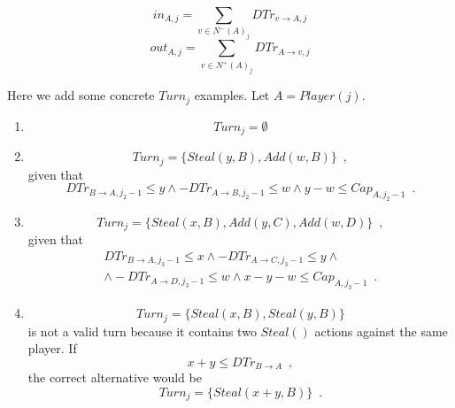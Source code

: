 \documentclass[11pt]{llncs}
\theoremstyle{definition}
\begin{document}
     \begin{definition}
     \label{inouttrust}
        \begin{equation}
           in_{A, j} = \sum\limits_{v \in N^{-}\left(A\right)_j}DTr_{v \rightarrow A, j}
        \end{equation}
        \begin{equation}
           out_{A, j} = \sum\limits_{v \in N^{+}\left(A\right)_j}DTr_{A \rightarrow v, j}
        \end{equation}
     \end{definition}
     
     Here we add some concrete $Turn_j$ examples. Let $A = Player(j)$.
     \begin{enumerate}
        \item \begin{equation*}
           Turn_j = \emptyset
        \end{equation*}
        \item \begin{equation*}
           Turn_j = \{Steal\left(y, B\right), Add\left(w, B\right)\} \enspace,
        \end{equation*}
        given that
        \begin{equation*}
           DTr_{B \rightarrow A, j_2 - 1} \leq y \wedge -DTr_{A \rightarrow B, j_2 - 1} \leq w \wedge y - w \leq
           Cap_{A, j_2-1} \enspace.
        \end{equation*}
        \item \begin{equation*}
           Turn_j = \{Steal\left(x, B\right), Add\left(y, C\right), Add\left(w, D\right)\} \enspace,
        \end{equation*}
        given that
        \begin{equation*}
        \begin{gathered}
           DTr_{B \rightarrow A, j_3 - 1} \leq x \wedge -DTr_{A \rightarrow C, j_3-1} \leq y \wedge \\
           \wedge -DTr_{A \rightarrow D, j_3 - 1} \leq w \wedge x - y - w \leq Cap_{A, j_3-1} \enspace.
        \end{gathered}
        \end{equation*}
        \item \begin{equation*}
           Turn_j = \{Steal\left(x, B\right), Steal\left(y, B\right)\}
        \end{equation*}
        is not a valid turn because it contains two $Steal\left(\right)$ actions against the same player. If
        \begin{equation*}
           x + y \leq DTr_{B \rightarrow A} \enspace,
        \end{equation*}
        the correct alternative would be
        \begin{equation*}
           Turn_j = \{Steal\left(x+y, B\right)\} \enspace.
        \end{equation*}
     \end{enumerate}
\end{document}
